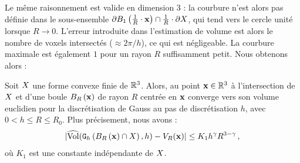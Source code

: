 Le même raisonnement est valide en dimension 3 : la courbure n'est alors pas
définie dans le sous-ensemble $\BT \Ball{1}{\frac{1}{R} \cdot \vx} \cap \frac{1}{R}
\cdot \dS$, qui tend vers le cercle unité lorsque $R \rightarrow 0$. L'erreur
introduite dans l'estimation de volume est alors le nombre de voxels intersectés
($\approx 2\pi/h$), ce qui est négligeable. La courbure maximale est également
$1$ pour un rayon $R$ suffisamment petit. Nous obtenons alors :
%
\begin{theorem}{}
  \label{thm:convergence-volume-intersection}
  Soit $\Shape$ une forme convexe finie de $\R^3$. Alors,  au point $\vx \in \R^3$ à l'intersection de $\Shape$ et
  d'une boule $\Ball{R}{\vx}$ de rayon $R$ centrée en $\vx$ converge vers son
  volume euclidien pour la discrétisation de Gauss au pas de discrétisation $h$,
  avec $0 < h \le R \le R_0$. Plus précisement, nous avons :
  \begin{equation}\label{eq:convergence-volume-intersection}
    | \VolC(\DigF{\Ball{R}{\vx} \cap \Shape}{h}, h) - V_R(\vx) | \le K_1 h^\gamma R^{3-\gamma} \,,
  \end{equation}
  où $K_1$ est une constante indépendante de $\Shape$.
\end{theorem}
%
